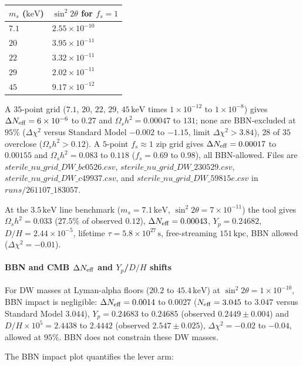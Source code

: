 \documentclass[11pt,a4paper]{article}
\begin{document}
\begin{longtable}{@{}p{}p{}@{}}
\toprule
\textbf{$m_s$ ($\mathrm{keV}$)} & \textbf{$\sin^2 2\theta$ for $f_s=1$} \\ \midrule \endhead
$7.1$ & $2.55\times10^{-10}$ \\
$20$ & $3.95\times10^{-11}$ \\
$22$ & $3.32\times10^{-11}$ \\
$29$ & $2.02\times10^{-11}$ \\
$45$ & $9.17\times10^{-12}$ \\
\bottomrule\end{longtable}
A $35$-point grid ($7.1$, $20$, $22$, $29$, $45\,\mathrm{keV}$ times $1\times10^{-12}$ to $1\times10^{-8}$) gives $\Delta N_{\rm eff} = 6\times10^{-6}$ to $0.27$ and $\Omega_s h^2 = 0.00047$ to $131$; none are BBN-excluded at $95\%$ ($\Delta\chi^2$ versus Standard Model $-0.002$ to $-1.15$, limit $\Delta\chi^2 > 3.84$), $28$ of $35$ overclose ($\Omega_s h^2 > 0.12$). A $5$-point $f_s \approx 1$ zip grid gives $\Delta N_{\rm eff} = 0.00017$ to $0.00155$ and $\Omega_s h^2 = 0.083$ to $0.118$ ($f_s = 0.69$ to $0.98$), all BBN-allowed. Files are $sterile\_nu\_grid\_DW\_bc0526.csv$, $sterile\_nu\_grid\_DW\_230529.csv$, $sterile\_nu\_grid\_DW\_c49937.csv$, and $sterile\_nu\_grid\_DW\_59815e.csv$ in $runs/261107\_183057$.

At the $3.5\,\mathrm{keV}$ line benchmark ($m_s = 7.1\,\mathrm{keV}$, $\sin^2 2\theta = 7\times10^{-11}$) the tool gives $\Omega_s h^2 = 0.033$ ($27.5\%$ of observed $0.12$), $\Delta N_{\rm eff} = 0.00043$, $Y_p = 0.24682$, $D/H = 2.44\times10^{-5}$, lifetime $\tau = 5.8\times10^{27}\,\mathrm{s}$, free-streaming $151\,\mathrm{kpc}$, BBN allowed ($\Delta\chi^2 = -0.01$).

\paragraph{BBN and CMB $\Delta N_{\rm eff}$ and $Y_p$/$D/H$ shifts}
For DW masses at Lyman-alpha floors ($20.2$ to $45.4\,\mathrm{keV}$) at $\sin^2 2\theta = 1\times10^{-10}$, BBN impact is negligible: $\Delta N_{\rm eff} = 0.0014$ to $0.0027$ ($N_{\rm eff} = 3.045$ to $3.047$ versus Standard Model $3.044$), $Y_p = 0.24683$ to $0.24685$ (observed $0.2449 \pm 0.004$) and $D/H \times10^5 = 2.4438$ to $2.4442$ (observed $2.547 \pm 0.025$), $\Delta\chi^2 = -0.02$ to $-0.04$, allowed at $95\%$. BBN does not constrain these DW masses.

The BBN impact plot quantifies the lever arm:
\end{document}
